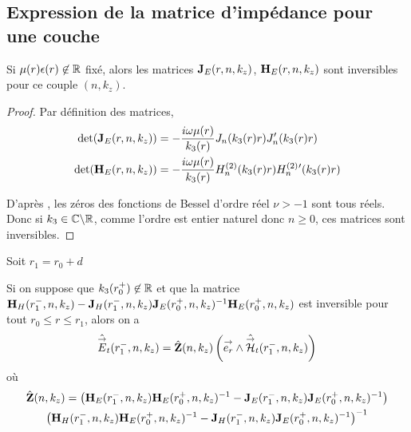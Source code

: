 

  \subsection{Expression de la matrice d'impédance pour une couche}

    \begin{lemme}
      \label{lem:cylindre:imp:inv_matrices_JE-HE}
      Si \(\mu(r)\epsilon(r)\not \in \mathbb R\) fixé, alors les matrices \(\mathbf{J}_E(r,n,k_z)\), \(\mathbf{H}_E(r,n,k_z)\) sont inversibles pour ce couple \((n,k_z)\).
    \end{lemme}
    \begin{proof}
      Par définition des matrices,
      \begin{align}
        \det(\mathbf{J}_E(r,n,k_z)) &= -\dfrac{i\omega\mu(r)}{k_3(r)}J_n(k_3(r)r)J_n'(k_3(r)r)
        \\
        \det(\mathbf{H}_E(r,n,k_z)) &= -\dfrac{i\omega\mu(r)}{k_3(r)}H_n^{(2)}(k_3(r)r)H_n^{(2)}{}'(k_3(r)r)
      \end{align}

      D’après \cite[p.~370]{abramowitz_handbook_1964}, les zéros des fonctions de Bessel d'ordre réel \(\nu >-1\) sont tous réels.
      Donc si \(k_3 \in\mathbb C\backslash\mathbb R\), comme l'ordre est entier naturel donc \(n\ge 0\), ces matrices sont inversibles.
    \end{proof}
    Soit \(r_1 = r_0 + d\)

    \begin{prop}
      Si on suppose que \(k_3(r_0^+) \not \in \mathbb R\) et que la matrice \(\mathbf{H}_{H}(r_1^-,n,k_z) - \mathbf{J}_{H}(r_1^-,n,k_z)\mathbf{J}_{E}(r_0^+,n,k_z)^{-1}\mathbf{H}_{E}(r_0^+,n,k_z)\) est inversible pour tout \(r_0 \le r \le r_1\), alors on a 
      \begin{equation*}
        \hat {{\overset{\rightarrow}{E}}}_t(r_1^-,n,k_z) = \hat {\mathbf{Z}}(n,k_z) \left({\overset{\rightarrow}{e_r}}\wedge \hat {{\overset{\rightarrow}{\mathcal{H}}}}_t(r_1^-,n,k_z)\right)
      \end{equation*}
      où
      \begin{multline*}
        \hat {\mathbf{Z}}(n,k_z) =
        \left(\mathbf{H}_{E}(r_1^-,n,k_z)\mathbf{H}_{E}(r_0^+,n,k_z)^{-1} - \mathbf{J}_{E}(r_1^-,n,k_z)\mathbf{J}_{E}(r_0^+,n,k_z)^{-1}\right)\\
        \left(\mathbf{H}_{H}(r_1^-,n,k_z)\mathbf{H}_{E}(r_0^+,n,k_z)^{-1} - \mathbf{J}_{H}(r_1^-,n,k_z)\mathbf{J}_{E}(r_0^+,n,k_z)^{-1}\right)^{-1}
      \end{multline*}
    \end{prop}

